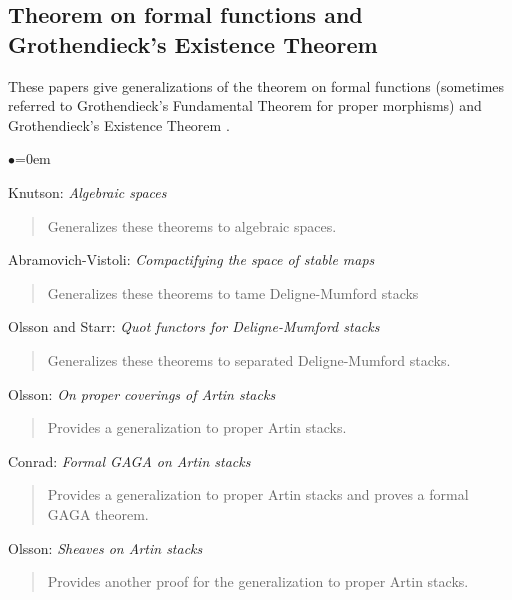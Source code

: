 \subsection{Theorem on formal functions and Grothendieck's Existence Theorem}
\label{subsection-theorem-formal-functions}

\noindent
These papers give generalizations of the theorem on formal functions
\cite[III.4.1.5]{EGA} (sometimes referred to Grothendieck's Fundamental
Theorem for proper morphisms) and Grothendieck's Existence
Theorem \cite[III.5.1.4]{EGA}.
\begin{list}{$\bullet$}{\leftmargin=0em}
\item Knutson:  \emph{Algebraic spaces} \cite[Chapter V]{knutson}
\begin{quote}
Generalizes these theorems to algebraic spaces.
\end{quote}
\smallskip

\item Abramovich-Vistoli: \emph{Compactifying the space of stable maps}
\cite[A.1.1]{abramovich-vistoli}
\begin{quote}
Generalizes these theorems to tame Deligne-Mumford stacks
\end{quote}
\smallskip

\item Olsson and Starr:  \emph{Quot functors for Deligne-Mumford stacks}
\cite{olsson-starr}
\begin{quote}
Generalizes these theorems to separated Deligne-Mumford stacks.
\end{quote}
\smallskip
\item Olsson: \emph{On proper coverings of Artin stacks}
\cite{olsson_proper}
\begin{quote}
Provides a generalization to proper Artin stacks.
\end{quote}
\smallskip

\item Conrad: \emph{Formal GAGA on Artin stacks} \cite{conrad_gaga}
\begin{quote}
Provides a generalization to proper Artin stacks and proves a formal
GAGA theorem.
\end{quote}
\smallskip

\item Olsson: \emph{Sheaves on Artin stacks} \cite{olsson_sheaves}
\begin{quote}
Provides another proof for the generalization to proper Artin stacks.
\end{quote}
\end{list}


